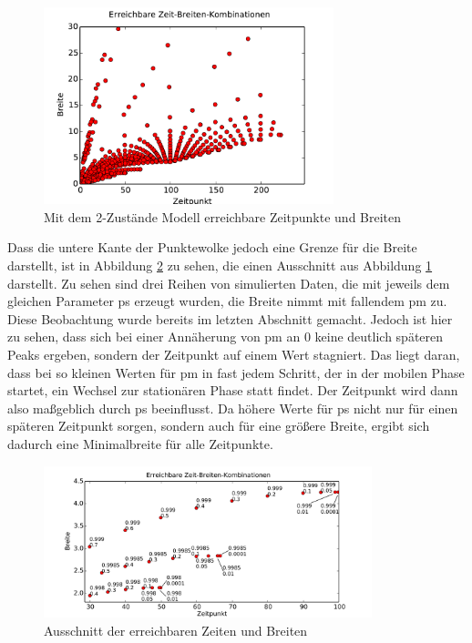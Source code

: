 \begin{figure}[h]
\centering
\includegraphics[width=0.75\textwidth]{bilder/2s_zeitbreiten_ohnep}
\caption{Mit dem 2-Zustände Modell erreichbare Zeitpunkte und Breiten}
\label{Grenzen_2p_ohnep}
\end{figure}

Dass die untere Kante der Punktewolke jedoch eine Grenze für die Breite darstellt, ist in Abbildung \ref{Grenzen_2p_ausschnitt} zu sehen, die einen Ausschnitt aus Abbildung \ref{Grenzen_2p_ohnep} darstellt. Zu sehen sind drei Reihen von simulierten Daten, die mit jeweils dem gleichen Parameter ps erzeugt wurden, die Breite nimmt mit fallendem pm zu. Diese Beobachtung wurde bereits im letzten Abschnitt gemacht. Jedoch ist hier zu sehen, dass sich bei einer Annäherung von pm an $0$ keine deutlich späteren Peaks ergeben, sondern der Zeitpunkt auf einem Wert stagniert. Das liegt daran, dass bei so kleinen Werten für pm in fast jedem Schritt, der in der mobilen Phase startet, ein Wechsel zur stationären Phase statt findet. Der Zeitpunkt wird dann also maßgeblich durch ps beeinflusst. Da höhere Werte für ps nicht nur für einen späteren Zeitpunkt sorgen, sondern auch für eine größere Breite, ergibt sich dadurch eine Minimalbreite für alle Zeitpunkte.

\begin{figure}[h]
\centering
\includegraphics[width=0.85\textwidth]{bilder/2s_zeitbreiten_ausschnitt.pdf}
\caption{Ausschnitt der erreichbaren Zeiten und Breiten}
\label{Grenzen_2p_ausschnitt}
\end{figure}

